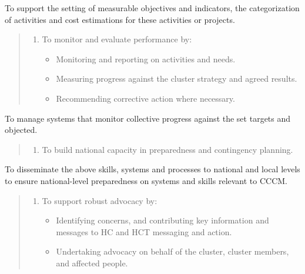 \documentclass[
  a4paper,
  onecolumn,
  oneside]{book}
\providecommand{\tightlist}{%
  \setlength{\itemsep}{0pt}\setlength{\parskip}{0pt}}\usepackage{longtable,booktabs,array}
\begin{document}
To support the setting of measurable objectives and indicators, the
categorization of activities and cost estimations for these activities
or projects.

\begin{quote}
\begin{enumerate}
\def\labelenumi{\arabic{enumi}.}
\setcounter{enumi}{3}
\tightlist
\item
  To monitor and evaluate performance by:

  \begin{itemize}
  \tightlist
  \item
    Monitoring and reporting on activities and needs.
  \item
    Measuring progress against the cluster strategy and agreed results.
  \item
    Recommending corrective action where necessary.
  \end{itemize}
\end{enumerate}
\end{quote}

To manage systems that monitor collective progress against the set
targets and objected.

\begin{quote}
\begin{enumerate}
\def\labelenumi{\arabic{enumi}.}
\setcounter{enumi}{4}
\tightlist
\item
  To build national capacity in preparedness and contingency planning.
\end{enumerate}
\end{quote}

To disseminate the above skills, systems and processes to national and
local levels to ensure national-level preparedness on systems and skills
relevant to CCCM.

\begin{quote}
\begin{enumerate}
\def\labelenumi{\arabic{enumi}.}
\setcounter{enumi}{5}
\tightlist
\item
  To support robust advocacy by:

  \begin{itemize}
  \tightlist
  \item
    Identifying concerns, and contributing key information and messages
    to HC and HCT messaging and action.
  \item
    Undertaking advocacy on behalf of the cluster, cluster members, and
    affected people.
  \end{itemize}
\end{enumerate}
\end{quote}
\end{document}
